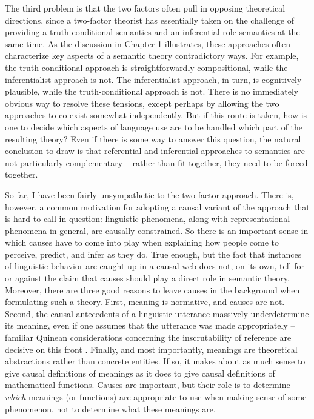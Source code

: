 The third problem is that the two factors often pull in opposing theoretical directions, since a two-factor theorist has essentially taken on the challenge of providing a truth-conditional semantics and an inferential role semantics at the same time. As the discussion in Chapter 1 illustrates, these approaches often characterize key aspects of a semantic theory contradictory ways. For example, the truth-conditional approach is straightforwardly compositional, while the inferentialist approach is not. The inferentialist approach, in turn, is cognitively plausible, while the truth-conditional approach is not. There is no immediately obvious way to resolve these tensions, except perhaps by allowing the two approaches to co-exist somewhat independently. But if this route is taken, how is one to decide which aspects of language use are to be handled which part of the resulting theory? Even if there is some way to answer this question, the natural conclusion to draw is that referential and inferential approaches to semantics are not particularly complementary -- rather than fit together, they need to be forced together. 

So far, I have been fairly unsympathetic to the two-factor approach. There is, however, a common motivation for adopting a causal variant of the approach that is hard to call in question: linguistic phenomena, along with representational phenomena in general, are causally constrained. So there is an important sense in which causes have to come into play when explaining how people come to perceive, predict, and infer as they do. True enough, but the fact that instances of linguistic behavior are caught up in a causal web does not, on its own, tell for or against the claim that causes should play a direct role in semantic theory. Moreover, there are three good reasons to leave causes in the background when formulating such a theory. First, meaning is normative, and causes are not. Second, the causal antecedents of a linguistic utterance massively underdetermine its meaning, even if one assumes that the utterance was made appropriately -- familiar Quinean considerations concerning the inscrutability of reference are decisive on this front \citep{Dennett:1991,Horwich:2005}. Finally, and most importantly, meanings are theoretical abstractions rather than concrete entities. If so, it makes about as much sense to give causal definitions of meanings as it does to give causal definitions of mathematical functions. Causes are important, but their role is to determine \textit{which} meanings (or functions) are appropriate to use when making sense of some phenomenon, not to determine what these meanings are. 

